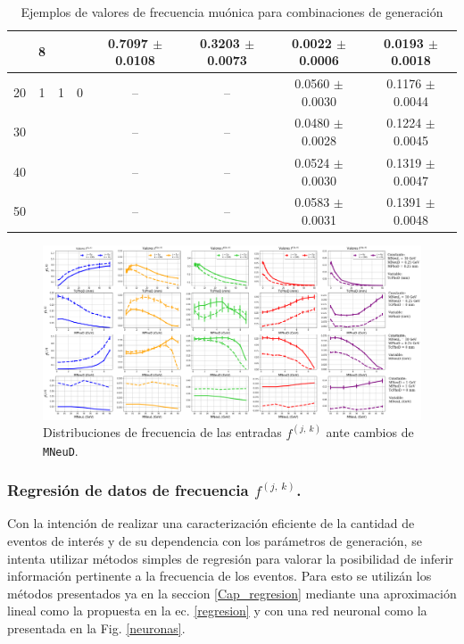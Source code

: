\begin{table}
\begin{scriptsize}
\begin{tabular}{|cccccccc|}
& 8 & & & 0.7097 $\pm$ 0.0108 & 0.3203 $\pm$ 0.0073 & 0.0022 $\pm$ 0.0006 & 0.0193 $\pm$ 0.0018\\
\hline
20 & 1 & 1 & 0 & -- & -- & 0.0560 $\pm$ 0.0030 & 0.1176 $\pm$ 0.0044 \\
30 & & & &  --  & -- & 0.0480 $\pm$ 0.0028 & 0.1224 $\pm$ 0.0045\\
40 & & & & -- & -- &  0.0524 $\pm$ 0.0030 &  0.1319 $\pm$ 0.0047 \\
50 & & & & -- & -- & 0.0583 $\pm$ 0.0031 & 0.1391 $\pm$ 0.0048 \\
\hline
\end{tabular}
\caption{Ejemplos de valores de frecuencia muónica para combinaciones de generación}
\label{Numero_de_Entradas}
\end{scriptsize}
\end{table}

\begin{figure}[!ht]
\centering
\includegraphics[width=.95\textwidth]{Simulacion/imagenes/Comparacion_Distribucion_Entries.png}
\caption{Distribuciones de frecuencia de las entradas $f^{(j,~k)}$ ante cambios de \texttt{MNeuD}.}
\label{entradasALL}
\end{figure}

\subsubsection{Regresión de datos de frecuencia $f^{(j,~k)}$.}

Con la intención de realizar una caracterización eficiente de la cantidad de eventos de interés y de su dependencia con los parámetros de generación, se intenta utilizar métodos simples de regresión para valorar la posibilidad de inferir información pertinente a la frecuencia de los eventos. Para esto se utilizán los métodos presentados ya en la seccion \ref{Cap_regresion} mediante una aproximación lineal como la propuesta en la ec. \ref{regresion} y con una red neuronal como la presentada en la Fig. \ref{neuronas}.

